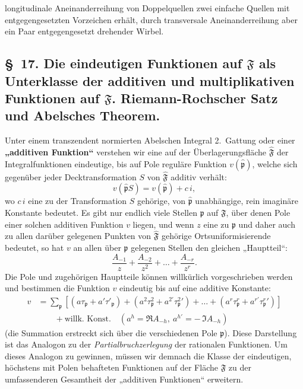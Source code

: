 \documentclass{article}
\begin{document}
longitudinale Aneinanderreihung von Doppelquellen zwei einfache Quellen mit entgegengesetzten Vorzeichen erhält, durch transversale Aneinanderreihung aber ein Paar entgegengesetzt drehender Wirbel.

\subsection*{§~17. Die eindeutigen Funktionen auf $\mathfrak{F}$ als Unterklasse der additiven und multiplikativen Funktionen auf $\mathfrak{F}$. Riemann-Rochscher Satz und Abelsches Theorem.}

Unter einem transzendent normierten Abelschen Integral 2.\ Gattung oder einer \textbf{„additiven Funktion“} verstehen wir eine auf der Überlagerungsfläche $\hat{\mathfrak{F}}$ der Integralfunktionen eindeutige, bis auf Pole reguläre Funktion $v(\hat{\mathfrak{p}})$, welche sich gegenüber jeder Decktransformation $S$ von $\hat{\mathfrak{F}}$ additiv verhält:
\[ v(\hat{\mathfrak{p}}S) = v(\hat{\mathfrak{p}}) + c\,i, \]
wo $c\,i$ eine zu der Transformation $S$ gehörige, von $\hat{\mathfrak{p}}$ unabhängige, rein imaginäre Konstante bedeutet. Es gibt nur endlich viele Stellen $\mathfrak{p}$ auf $\mathfrak{F}$, über denen Pole einer solchen additiven Funktion $v$ liegen, und wenn $z$ eine zu $\mathfrak{p}$ und daher auch zu allen darüber gelegenen Punkten von $\hat{\mathfrak{F}}$ gehörige Ortsuniformisierende bedeutet, so hat $v$ an allen über $\mathfrak{p}$ gelegenen Stellen den gleichen „Hauptteil“:
\[ \frac{A_{-1}}{z} + \frac{A_{-2}}{z^2} + \dots + \frac{A_{-r}}{z^r}. \]
Die Pole und zugehörigen Hauptteile können willkürlich vorgeschrieben werden und bestimmen die Funktion $v$ eindeutig bis auf eine additive Konstante:
\[ \begin{aligned}
v &= \sum\limits_\mathfrak{p} \left[ (a\tau_\mathfrak{p} + a'\tau'_\mathfrak{p}) + (a^2\tau_\mathfrak{p}^2 + a^{2\prime}{\tau_\mathfrak{p}^2}') + \dots + (a^r\tau_\mathfrak{p}^r + a^{r\prime}{\tau_\mathfrak{p}^r}') \right] \\
&\qquad + \text{willk.\ Konst.} \quad (a^h = \Re A_{-h}, \ a^{h\prime} = -\,\Im A_{-h})
\end{aligned} \tag{40} \]
(die Summation erstreckt sich über die verschiedenen Pole $\mathfrak{p}$). Diese Darstellung ist das Analogon zu der \emph{Partialbruchzerlegung} der rationalen Funktionen. Um dieses Analogon zu gewinnen, müssen wir demnach die Klasse der eindeutigen, höchstens mit Polen behafteten Funktionen auf der Fläche $\mathfrak{F}$ zu der umfassenderen Gesamtheit der „additiven Funktionen“ erweitern.
\end{document}
